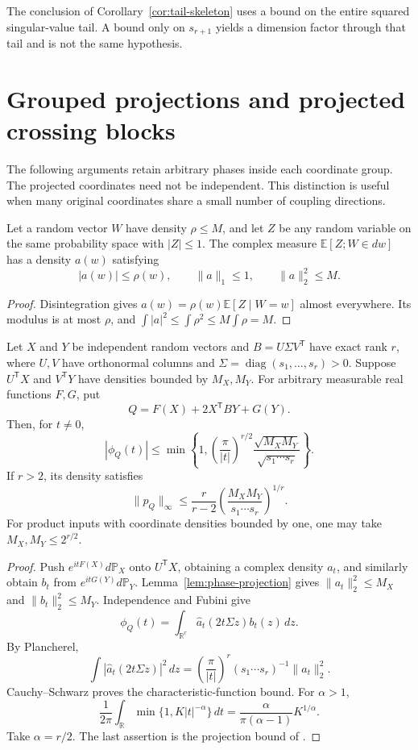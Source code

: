 The conclusion of Corollary~\ref{cor:tail-skeleton} uses a
bound on the entire squared singular-value tail.  A bound
only on \(s_{r+1}\) yields a dimension factor through that
tail and is not the same hypothesis.

\section{Grouped projections and projected crossing blocks}
\label{sec:grouped-crossing}

The following arguments retain arbitrary phases inside each
coordinate group.  The projected coordinates need not be
independent.  This distinction is useful when many original
coordinates share a small number of coupling directions.

\begin{lemma}
\label{lem:phase-projection}
Let a random vector \(W\) have density \(\rho\leq M\), and
let \(Z\) be any random variable on the same probability
space with \(|Z|\leq1\).  The complex measure
\(\mathbb E[Z;W\in dw]\) has a density \(a(w)\) satisfying
\[
 |a(w)|\leq\rho(w),\qquad
 \|a\|_1\leq1,\qquad \|a\|_2^2\leq M.
\]
\end{lemma}
\begin{proof}
Disintegration gives
\(a(w)=\rho(w)\mathbb E[Z\mid W=w]\) almost everywhere.
Its modulus is at most \(\rho\), and
\(\int|a|^2\leq\int\rho^2\leq M\int\rho=M\).
\end{proof}

\begin{theorem}
\label{thm:exact-crossblock}
Let \(X\) and \(Y\) be independent random vectors and
\(B=U\Sigma V^{\mathsf T}\) have exact rank \(r\), where
\(U,V\) have orthonormal columns and
\(\Sigma=\operatorname{diag}(s_1,\ldots,s_r)>0\).
Suppose \(U^{\mathsf T}X\) and \(V^{\mathsf T}Y\) have
densities bounded by \(M_X,M_Y\).
For arbitrary measurable real functions \(F,G\), put
\[
 Q=F(X)+2X^{\mathsf T}BY+G(Y).
\]
Then, for \(t\ne0\),
\[
 |\phi_Q(t)|\leq
 \min\left\{1,
 \left(\frac{\pi}{|t|}\right)^{r/2}
 \frac{\sqrt{M_XM_Y}}{\sqrt{s_1\cdots s_r}}\right\}.
\]
If \(r>2\), its density satisfies
\[
 \|p_Q\|_\infty\leq
 \frac r{r-2}
 \left(\frac{M_XM_Y}{s_1\cdots s_r}\right)^{1/r}.
\]
For product inputs with coordinate densities bounded by one,
one may take \(M_X,M_Y\leq2^{r/2}\).
\end{theorem}
\begin{proof}
Push \(e^{itF(X)}d\mathbb P_X\) onto \(U^{\mathsf T}X\),
obtaining a complex density \(a_t\), and similarly obtain
\(b_t\) from \(e^{itG(Y)}d\mathbb P_Y\).
Lemma~\ref{lem:phase-projection} gives
\(\|a_t\|_2^2\leq M_X\) and
\(\|b_t\|_2^2\leq M_Y\).
Independence and Fubini give
\[
 \phi_Q(t)=\int_{\mathbb R^r}
       \widehat a_t(2t\Sigma z)b_t(z)\,dz .
\]
By Plancherel,
\[
 \int|\widehat a_t(2t\Sigma z)|^2\,dz
 =\left(\frac{\pi}{|t|}\right)^r
   (s_1\cdots s_r)^{-1}\|a_t\|_2^2 .
\]
Cauchy--Schwarz proves the characteristic-function bound.
For \(\alpha>1\),
\[
 \frac1{2\pi}\int_{\mathbb R}\min\{1,K|t|^{-\alpha}\}\,dt
 =\frac{\alpha}{\pi(\alpha-1)}K^{1/\alpha}.
\]
Take \(\alpha=r/2\).  The last assertion is the projection
bound of \citet{LPP2016}.
\end{proof}

